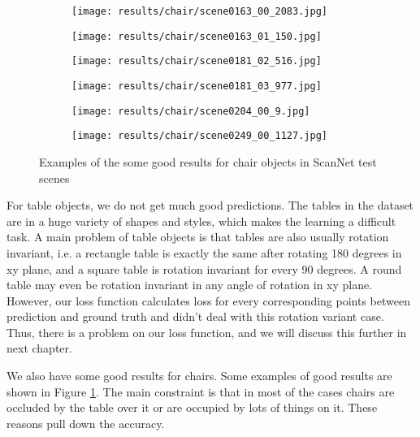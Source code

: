 \begin{figure}[h!]
  \begin{subfigure}[b]{0.32\linewidth}
    \texttt{[image: results/chair/scene0163\_00\_2083.jpg]}
  \end{subfigure}
  \begin{subfigure}[b]{0.32\linewidth}
    \texttt{[image: results/chair/scene0163\_01\_150.jpg]}
  \end{subfigure}
  \begin{subfigure}[b]{0.32\linewidth}
    \texttt{[image: results/chair/scene0181\_02\_516.jpg]}
  \end{subfigure}
  \begin{subfigure}[b]{0.32\linewidth}
    \texttt{[image: results/chair/scene0181\_03\_977.jpg]}
  \end{subfigure}
  \begin{subfigure}[b]{0.32\linewidth}
    \texttt{[image: results/chair/scene0204\_00\_9.jpg]}
  \end{subfigure}
  \begin{subfigure}[b]{0.32\linewidth}
    \texttt{[image: results/chair/scene0249\_00\_1127.jpg]}
  \end{subfigure}
  \caption{Examples of the some good results for chair objects in ScanNet test scenes}
  \label{fig:result_chair}
\end{figure}

For table objects, we do not get much good predictions. The tables in the dataset are in a huge variety of shapes and styles, which makes the learning a difficult task. A main problem of table objects is that tables are also usually rotation invariant, i.e. a rectangle table is exactly the same after rotating 180 degrees in xy plane, and a square table is rotation invariant for every 90 degrees. A round table may even be rotation invariant in any angle of rotation in xy plane. However, our loss function calculates loss for every corresponding points between prediction and ground truth and didn't deal with this rotation variant case. Thus, there is a problem on our loss function, and we will discuss this further in next chapter.

We also have some good results for chairs. Some examples of good results are shown in Figure \ref{fig:result_chair}. The main constraint is that in most of the cases chairs are occluded by the table over it or are occupied by lots of things on it. These reasons pull down the accuracy.